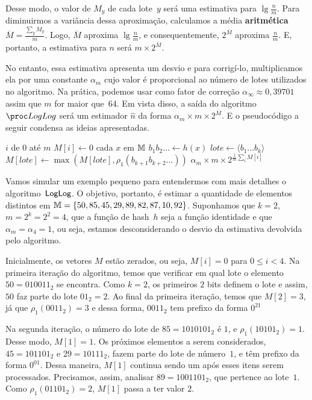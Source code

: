 Desse modo, o valor de $M_y$ de cada lote~$y$ será uma estimativa para $\lg \frac{n}{m}$. Para diminuirmos a variância 
dessa aproximação, calculamos a média \textbf{aritmética} $\overline{M} = \frac{\sum_y M_y}{m}$. Logo, $\overline{M}$ 
aproxima $\lg \frac{n}{m}$, e consequentemente, $2^{\overline{M}}$ aproxima $\frac{n}{m}$. E, portanto, a estimativa 
para $n$ será $m \times 2^{\overline{M}}$.

No entanto, essa estimativa apresenta um desvio e para corrigí-lo, multiplicamos ela por uma constante $\alpha_m$ cujo 
valor é proporcional ao número de lotes utilizados no algoritmo. Na prática, podemos usar como fator de correção 
$\alpha_\infty \approx 0{,}39701$ assim que $m$ for maior que~64. Em vista disso, a saída do algoritmo~$\LOG$ será um 
estimador $\hat{n}$ da forma $\alpha_m \times m \times 2^{\overline{M}}$. E o pseudocódigo a seguir condensa as ideias 
apresentadas.

\begin{codebox}
  \li \For $i$ de $0$ até $m$
        \Do
  \li   $M[i] \gets 0$
        \End
  \li \For cada $x$ em $\mathbb{M}$ 
        \Do
  \li   $b_1b_2{\dots} \gets h(x)$
  \li   $lote \gets \langle b_1 {\dots} b_k \rangle$
  \li   $M[lote] \gets \max(M[lote], \rho_1(b_{k+1}b_{k+2}{\dots}))$
        \End
  \li
  \Return $\alpha_m \times m \times 2^{\frac{1}{m}\sum_i{M[i]}}$   
  \End
\end{codebox}

Vamos simular um exemplo pequeno para entendermos com mais detalhes o algoritmo~$\textsf{LogLog}$. O objetivo, portanto, é 
estimar a quantidade de elementos distintos em $\mathbb{M} = \{ 50, 85, 45, 29, 89, 82, 87, 10, 92 \}$. Suponhamos que 
$k = 2$, $m = 2^{k} = 2^2 = 4$, que a função de hash~$h$ seja a função identidade e que $\alpha_m = \alpha_4 = 1$, 
ou seja, estamos desconsiderando o desvio da estimativa devolvida pelo algoritmo. 

Inicialmente, os vetores $M$ estão zerados, ou seja, $M[i] = 0$ para $0 \leq i < 4$. Na primeira iteração do algoritmo,
temos que verificar em qual lote o elemento $50 = 010011_2$ se encontra. Como $k = 2$, os primeiros $2$ bits definem o
lote e assim, $50$ faz parte do lote $01_2 = 2$. Ao final da primeira iteração, temos que $M[2] = 3$, já que 
$\rho_1(0011_2) = 3$ e dessa forma, $0011_2$ tem prefixo da forma $0^21$

Na segunda iteração, o número do lote de $85 = 1010101_2$ é $1$, e $\rho_1(10101_2) = 1$. Desse modo, $M[1] = 1$. Os 
próximos elementos a serem considerados, $45 = 101101_2$ e $29 = 10111_2$, fazem parte do lote de número~$1$, e têm 
prefixo da forma $0^01$. Dessa maneira, $M[1]$ continua sendo um após esses itens serem processados. Precisamos, assim,
analisar $89 = 1001101_2$, que pertence ao lote~$1$. Como $\rho_1(01101_2) = 2$, $M[1]$ passa a ter valor $2$.

